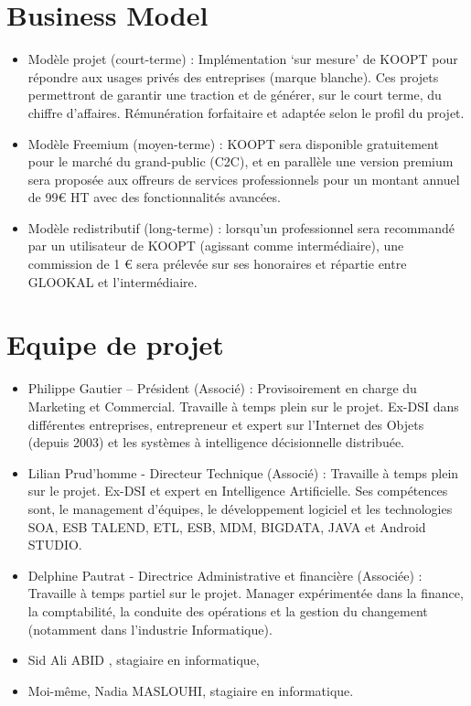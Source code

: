 \section{Business Model}
 \begin{itemize}
     \item Modèle projet (court-terme) : Implémentation ‘sur mesure’ de KOOPT pour répondre aux usages privés des entreprises (marque blanche). Ces projets permettront de garantir une traction et de générer, sur le court terme, du chiffre d’affaires. Rémunération forfaitaire et adaptée selon le profil du projet.
     \item Modèle Freemium (moyen-terme) : KOOPT sera disponible gratuitement pour le marché du grand-public (C2C), et en parallèle une version premium sera proposée aux offreurs de services professionnels pour un montant annuel de 99€ HT avec des fonctionnalités avancées.		
     \item Modèle redistributif (long-terme) : lorsqu’un professionnel sera recommandé par un utilisateur de KOOPT (agissant comme intermédiaire), une commission de 1 € sera prélevée sur ses honoraires et répartie entre GLOOKAL et l’intermédiaire. 
 \end{itemize}
		



 \section{Equipe de projet}
 
  \begin{itemize}
      \item Philippe Gautier – Président (Associé) : Provisoirement en charge du Marketing et Commercial. Travaille à temps plein sur le projet. Ex-DSI dans différentes entreprises, entrepreneur et expert sur l’Internet des Objets (depuis 2003) et les systèmes à intelligence décisionnelle distribuée.							
      \item Lilian Prud’homme - Directeur Technique (Associé) : Travaille à temps plein sur le projet. Ex-DSI et expert en Intelligence Artificielle. Ses compétences sont, le management d’équipes, le développement logiciel et les technologies SOA, ESB TALEND, ETL, ESB, MDM, BIGDATA, JAVA et Android STUDIO.
 
      \item Delphine Pautrat - Directrice Administrative et financière (Associée) : Travaille à temps partiel sur le projet. Manager expérimentée dans la finance, la comptabilité, la conduite des opérations et la gestion du changement (notamment dans l’industrie Informatique).
      \item Sid Ali ABID , stagiaire en informatique,
      \item Moi-même, Nadia MASLOUHI, stagiaire en informatique.
    
  \end{itemize}
	
